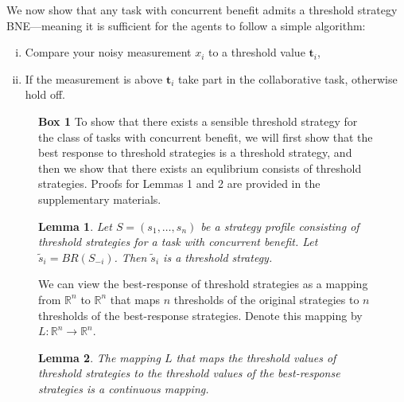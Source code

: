 \documentclass{nature}
\newtheorem{lemma}{Lemma}
\def\R{\mathbb{R}}    %
\def\td{\mathbf{t}}   %
\begin{document}
We now show that any task with concurrent benefit admits a threshold strategy BNE---meaning it is sufficient for the agents to follow a simple algorithm: 
\begin{enumerate}[(i)]
\item Compare your noisy measurement $x_i$ to a threshold value $\td_i$,
\item If the measurement is above $\td_i$ take part in the collaborative task, otherwise hold off.
\end{enumerate}

\nolinenumbers
\begin{figure}
\begin{framed}
\textbf{Box 1}
To show that there exists a sensible threshold strategy for the class of tasks with concurrent benefit, we will first show that the best response to threshold strategies is a threshold strategy, and then we show that there exists an equlibrium consists of threshold strategies\cite{Carlsson1993, Morris2000}. Proofs for Lemmas 1 and 2 are provided in the supplementary materials.
\begin{lemma}\label{lemma:thresholdBR}
Let $S=(s_1,\ldots,s_n)$ be a strategy profile consisting of threshold strategies for a task with  concurrent benefit. Let $\tilde{s}_i=BR(S_{-i})$. Then $\tilde{s}_i$ is a threshold strategy. 
\end{lemma}

We can view the best-response of threshold strategies as a mapping from $\R^n$ to $\R^n$ that maps $n$ thresholds of the original strategies to $n$ thresholds of the best-response strategies. Denote this mapping by $L:\R^n\to\R^n$.
\begin{lemma}\label{lemma:continuous}
The mapping $L$ that maps the threshold values of threshold strategies to the threshold values of the best-response strategies is a continuous mapping. 
\end{lemma}


\end{framed}
\end{figure}
\end{document}
